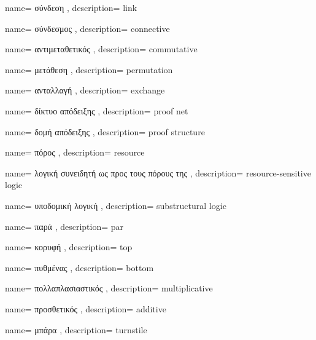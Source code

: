 {name={
σύνδεση
},
description={
link
}}

{name={
σύνδεσμος
},
description={
connective
}}

{name={
αντιμεταθετικός
},
description={
commutative
}}

{name={
μετάθεση
},
description={
permutation
}}

{name={
ανταλλαγή
},
description={
exchange
}}

{name={
δίκτυο απόδειξης
},
description={
proof net
}}

{name={
δομή απόδειξης
},
description={
proof structure
}}


{name={
πόρος
},
description={
resource
}}

{name={
λογική συνειδητή ως προς τους πόρους της
},
description={
resource-sensitive logic
}}


{name={
υποδομική λογική
},
description={
substructural logic
}}

{name={
παρά
},
description={
par
}}

{name={
κορυφή
},
description={
top
}}

{name={
πυθμένας
},
description={
bottom
}}

{name={
πολλαπλασιαστικός
},
description={
multiplicative
}}

{name={
προσθετικός
},
description={
additive
}}

{name={
μπάρα
},
description={
turnstile
}}

